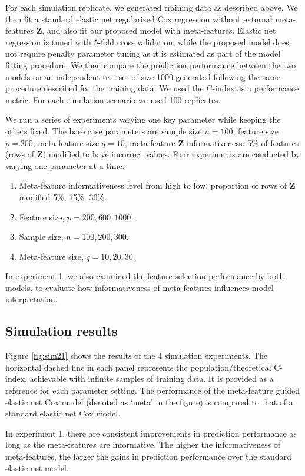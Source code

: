 For each simulation replicate, we generated training data as described above. We then fit a standard elastic net regularized Cox regression without external meta-features $\bm{Z}$, and also fit our proposed model with meta-features. Elastic net regression is tuned with 5-fold cross validation, while the proposed model does not require penalty parameter tuning as it is estimated as part of the model fitting procedure. We then compare the prediction performance between the two models on an independent test set of size 1000 generated following the same procedure described for the training data. We used the C-index as a performance metric. For each simulation scenario we used 100 replicates. 

We run a series of experiments varying one key parameter while keeping the others fixed. The base case parameters are sample size $n=100$, feature size $p=200$, meta-feature size $q=10$, meta-feature $\bm{Z}$ informativeness: 5\% of features (rows of $\bm{Z}$) modified to have incorrect values. Four experiments are conducted by varying one parameter at a time.
\begin{enumerate}
    \item Meta-feature informativeness level from high to low, proportion of rows of $\bm{Z}$ modified 5\%, 15\%, 30\%.
    \item Feature size, $p=200, 600, 1000$.
    \item Sample size, $n=100, 200, 300$.
    \item Meta-feature size, $q=10, 20, 30$.
\end{enumerate}
In experiment 1, we also examined the feature selection performance by both models, to evaluate how informativeness of meta-features influences model interpretation.

\subsection{Simulation results}
Figure \ref{fig:sim21} shows the results of the 4 simulation experiments. The horizontal dashed line in each panel represents the population/theoretical C-index, achievable with infinite samples of training data. It is provided as a reference for each parameter setting. The performance of the meta-feature guided elastic net Cox model (denoted as `meta' in the figure) is compared to that of a standard elastic net Cox model. 

In experiment 1, there are consistent improvements in prediction performance as long as the meta-features are informative. The higher the informativeness of meta-features, the larger the gains in prediction performance over the standard elastic net model.

